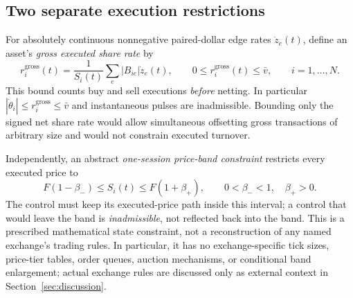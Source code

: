 \documentclass[review,hidelinks,onefignum,onetabnum]{siamonline250211}
\begin{document}
\subsection{Two separate execution restrictions}\label{subsec:execution-restrictions}
For absolutely continuous nonnegative paired-dollar edge rates $\dot z_e(t)$, define an asset's \emph{gross executed share rate} by
\begin{equation}\label{eq:grossrate}
 r_i^{\mathrm{gross}}(t)=\frac{1}{S_i(t)}\sum_e |B_{ie}|\dot z_e(t),\qquad
 0\le r_i^{\mathrm{gross}}(t)\le\bar v,\qquad i=1,\ldots,N.
\end{equation}
This bound counts buy and sell executions \emph{before} netting. In particular $|\dot\theta_i|\le r_i^{\mathrm{gross}}\le\bar v$ and instantaneous pulses are inadmissible. Bounding only the signed net share rate would allow simultaneous offsetting gross transactions of arbitrary size and would not constrain executed turnover.

Independently, an abstract \emph{one-session price-band constraint} restricts every executed price to
\begin{equation}\label{eq:band}
 F(1-\beta_-)\le S_i(t)\le F(1+\beta_+),\qquad
 0<\beta_-<1,\quad\beta_+>0.
\end{equation}
The control must keep its executed-price path inside this interval; a control that would leave the band is \emph{inadmissible}, not reflected back into the band. This is a prescribed mathematical state constraint, not a reconstruction of any named exchange's trading rules. In particular, it has no exchange-specific tick sizes, price-tier tables, order queues, auction mechanisms, or conditional band enlargement; actual exchange rules are discussed only as external context in Section~\ref{sec:discussion}.
\end{document}
